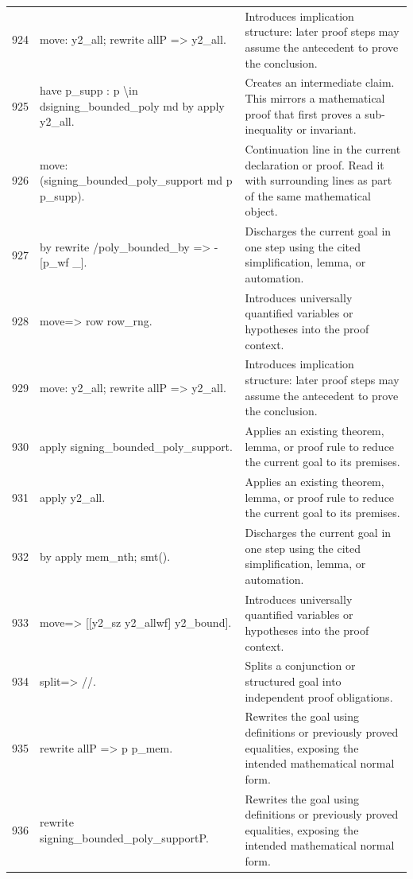 \documentclass[10pt]{article}
\begin{document}
\begin{longtable}{r L{0.53\textwidth} L{0.37\textwidth}}
924 & {\ttfamily\scriptsize     move: y2\_all; rewrite allP => y2\_all.} & Introduces implication structure: later proof steps may assume the antecedent to prove the conclusion. \\
925 & {\ttfamily\scriptsize     have p\_supp : p \textbackslash{}in dsigning\_bounded\_poly md by apply y2\_all.} & Creates an intermediate claim.  This mirrors a mathematical proof that first proves a sub-inequality or invariant. \\
926 & {\ttfamily\scriptsize     move: (signing\_bounded\_poly\_support md p p\_supp).} & Continuation line in the current declaration or proof.  Read it with surrounding lines as part of the same mathematical object. \\
927 & {\ttfamily\scriptsize     by rewrite /poly\_bounded\_by => -[p\_wf \_].} & Discharges the current goal in one step using the cited simplification, lemma, or automation. \\
928 & {\ttfamily\scriptsize   move=> row row\_rng.} & Introduces universally quantified variables or hypotheses into the proof context. \\
929 & {\ttfamily\scriptsize   move: y2\_all; rewrite allP => y2\_all.} & Introduces implication structure: later proof steps may assume the antecedent to prove the conclusion. \\
930 & {\ttfamily\scriptsize   apply signing\_bounded\_poly\_support.} & Applies an existing theorem, lemma, or proof rule to reduce the current goal to its premises. \\
931 & {\ttfamily\scriptsize   apply y2\_all.} & Applies an existing theorem, lemma, or proof rule to reduce the current goal to its premises. \\
932 & {\ttfamily\scriptsize   by apply mem\_nth; smt().} & Discharges the current goal in one step using the cited simplification, lemma, or automation. \\
933 & {\ttfamily\scriptsize move=> [[y2\_sz y2\_allwf] y2\_bound].} & Introduces universally quantified variables or hypotheses into the proof context. \\
934 & {\ttfamily\scriptsize split=> //.} & Splits a conjunction or structured goal into independent proof obligations. \\
935 & {\ttfamily\scriptsize rewrite allP => p p\_mem.} & Rewrites the goal using definitions or previously proved equalities, exposing the intended mathematical normal form. \\
936 & {\ttfamily\scriptsize rewrite signing\_bounded\_poly\_supportP.} & Rewrites the goal using definitions or previously proved equalities, exposing the intended mathematical normal form. \\

\end{longtable}
\end{document}
